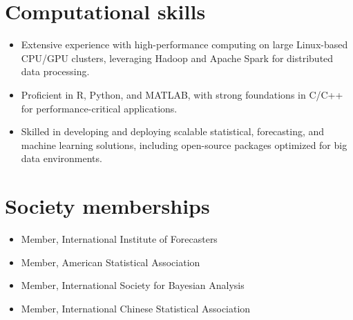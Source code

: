 \documentclass[twoside,a4paper]{article}
\begin{document}
\section{Computational skills}
\begin{itemize}

\item Extensive experience with high-performance computing on large Linux-based CPU/GPU clusters, leveraging Hadoop and Apache Spark for distributed data processing.

\item Proficient in R, Python, and MATLAB, with strong foundations in C/C++ for performance-critical applications.

\item Skilled in developing and deploying scalable statistical, forecasting, and machine learning solutions, including open-source packages optimized for big data environments.

\end{itemize}


\section{Society memberships}

\begin{itemize}
\item Member, International Institute of Forecasters
\item Member, American Statistical Association
\item Member, International Society for Bayesian Analysis
\item Member, International Chinese Statistical Association
\end{itemize}





\end{document}
